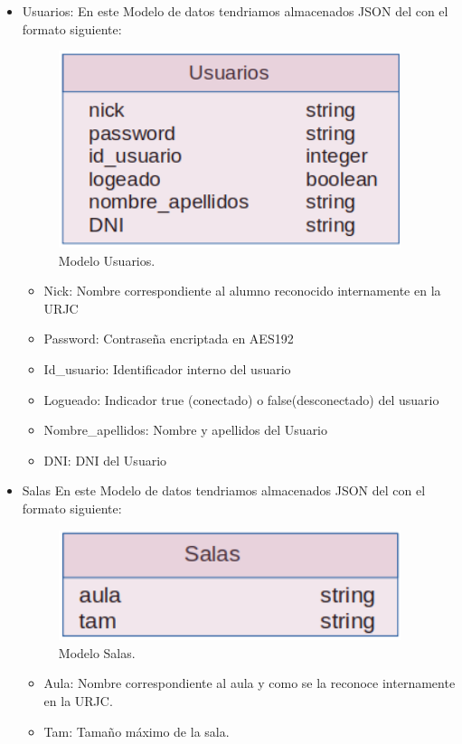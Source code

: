 \documentclass[a4paper, 12pt]{book}
\begin{document}
\begin{itemize}
	\item Usuarios: En este Modelo de datos tendriamos almacenados JSON del con el formato siguiente:
	\begin{figure}[H]
  	\centering
  	\includegraphics[width=10cm, keepaspectratio]{img/mongoDBUsuarios.png}
  	\caption{Modelo Usuarios.}\label{fig:mongoDBUsuarios}
	\end{figure}
		\begin{itemize}
		\item Nick: Nombre correspondiente al alumno reconocido internamente en la URJC
		\item Password: Contraseña encriptada en AES192
		\item Id\_usuario: Identificador interno del usuario
		\item Logueado: Indicador true (conectado) o false(desconectado) del usuario
		\item Nombre\_apellidos: Nombre y apellidos del Usuario
		\item DNI: DNI del Usuario
		\end{itemize}
	
	\item Salas En este Modelo de datos tendriamos almacenados JSON del con el formato siguiente:
	\begin{figure}[H]
  	\centering
  	\includegraphics[width=10cm, keepaspectratio]{img/mongoDBSalas.png}
  	\caption{Modelo Salas.}\label{fig:mongoDBSalas}
	\end{figure}
	
	\begin{itemize}
		\item Aula: Nombre correspondiente al aula y como se la reconoce internamente en la URJC.
		\item Tam: Tamaño máximo de la sala.
		\end{itemize}
	

\end{itemize}
\end{document}
